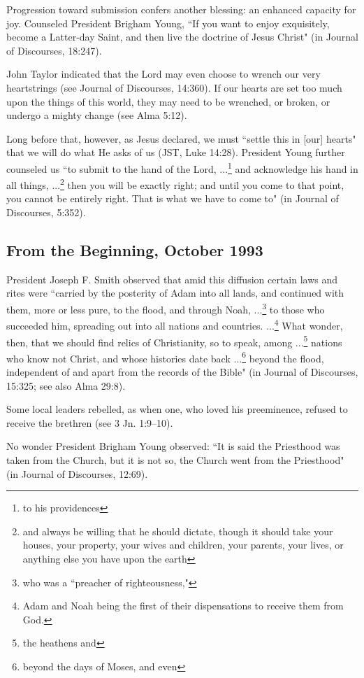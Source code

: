 Progression toward submission confers another blessing: an enhanced capacity for joy. Counseled President Brigham Young, ``If you want to enjoy exquisitely, become a Latter-day Saint, and then live the doctrine of Jesus Christ" (in Journal of Discourses, 18:247).

John Taylor indicated that the Lord may even choose to wrench our very heartstrings (see Journal of Discourses, 14:360). If our hearts are set too much upon the things of this world, they may need to be wrenched, or broken, or undergo a mighty change (see Alma 5:12).

Long before that, however, as Jesus declared, we must ``settle this in [our] hearts" that we will do what He asks of us (JST, Luke 14:28). President Young further counseled us ``to submit to the hand of the Lord, ...\footnote{to his providences} and acknowledge his hand in all things, ...\footnote{and always be willing that he should dictate, though it should take your houses, your property, your wives and children, your parents, your lives, or anything else you have upon the earth} then you will be exactly right; and until you come to that point, you cannot be entirely right. That is what we have to come to" (in Journal of Discourses, 5:352).

\subsection{From the Beginning, October 1993}

President Joseph F. Smith observed that amid this diffusion certain laws and rites were ``carried by the posterity of Adam into all lands, and continued with them, more or less pure, to the flood, and through Noah, ...\footnote{
who was a ``preacher of righteousness,"  
} to those who succeeded him, spreading out into all nations and countries. ...\footnote{Adam and Noah being the first of their dispensations to receive them from God.} What wonder, then, that we should find relics of Christianity, so to speak, among ...\footnote{the heathens and} nations who know not Christ, and whose histories date back ...\footnote{beyond the days of Moses, and even} beyond the flood, independent of and apart from the records of the Bible" (in Journal of Discourses, 15:325; see also Alma 29:8).

Some local leaders rebelled, as when one, who loved his preeminence, refused to receive the brethren (see 3 Jn. 1:9–10).

No wonder President Brigham Young observed: ``It is said the Priesthood was taken from the Church, but it is not so, the Church went from the Priesthood" (in Journal of Discourses, 12:69).

